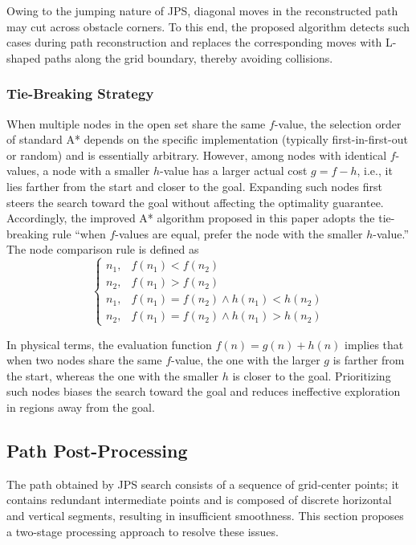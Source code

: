 \documentclass[pdflatex,sn-basic,Numbered]{sn-jnl}
\begin{document}
Owing to the jumping nature of JPS, diagonal moves in the reconstructed path may cut across obstacle corners. To this end, the proposed algorithm detects such cases during path reconstruction and replaces the corresponding moves with L-shaped paths along the grid boundary, thereby avoiding collisions.

\subsubsection{Tie-Breaking Strategy}

When multiple nodes in the open set share the same $f$-value, the selection order of standard A* depends on the specific implementation (typically first-in-first-out or random) and is essentially arbitrary. However, among nodes with identical $f$-values, a node with a smaller $h$-value has a larger actual cost $g = f - h$, i.e., it lies farther from the start and closer to the goal. Expanding such nodes first steers the search toward the goal without affecting the optimality guarantee. Accordingly, the improved A* algorithm proposed in this paper adopts the tie-breaking rule ``when $f$-values are equal, prefer the node with the smaller $h$-value.'' The node comparison rule is defined as
\begin{equation}
\begin{cases}
n_1, & f(n_1) < f(n_2) \\
n_2, & f(n_1) > f(n_2) \\
n_1, & f(n_1) = f(n_2) \land h(n_1) < h(n_2) \\
n_2, & f(n_1) = f(n_2) \land h(n_1) > h(n_2)
\end{cases}
\label{eq:tbreak}
\end{equation}

In physical terms, the evaluation function $f(n) = g(n) + h(n)$ implies that when two nodes share the same $f$-value, the one with the larger $g$ is farther from the start, whereas the one with the smaller $h$ is closer to the goal. Prioritizing such nodes biases the search toward the goal and reduces ineffective exploration in regions away from the goal.

\subsection{Path Post-Processing}
\label{subsec:post}

The path obtained by JPS search consists of a sequence of grid-center points; it contains redundant intermediate points and is composed of discrete horizontal and vertical segments, resulting in insufficient smoothness. This section proposes a two-stage processing approach to resolve these issues.
\end{document}
